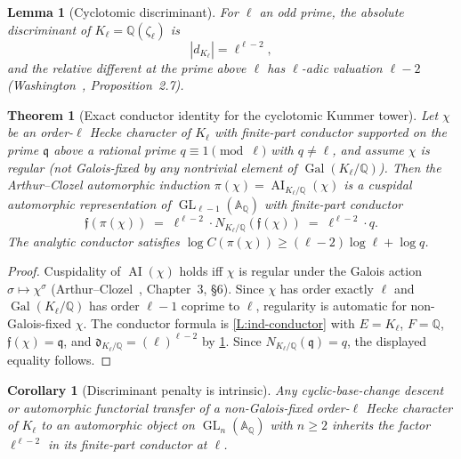\documentclass[11pt]{article}
\newtheorem{theorem}{Theorem}
\newtheorem{lemma}{Lemma}
\newtheorem{corollary}{Corollary}
\newcommand{\Q}{\mathbb Q}
\newcommand{\A}{\mathbb A}
\newcommand{\Gal}{\operatorname{Gal}}
\newcommand{\AI}{\operatorname{AI}}
\newcommand{\GL}{\operatorname{GL}}
\begin{document}
\begin{lemma}[Cyclotomic discriminant]\label{L:cyclo-disc}
For \(\ell\) an odd prime, the absolute discriminant of \(K_\ell=\Q(\zeta_\ell)\) is
\[
|d_{K_\ell}|=\ell^{\ell-2},
\]
and the relative different at the prime above \(\ell\) has \(\ell\)-adic valuation \(\ell-2\) (Washington~\cite{Washington}, Proposition~2.7).
\end{lemma}

\begin{theorem}[Exact conductor identity for the cyclotomic Kummer tower]\label{T:conductor-identity}
Let \(\chi\) be an order-\(\ell\) Hecke character of \(K_\ell\) with finite-part conductor supported on the prime \(\mathfrak q\) above a rational prime \(q\equiv 1\pmod\ell\) with \(q\ne\ell\), and assume \(\chi\) is regular (not Galois-fixed by any nontrivial element of \(\Gal(K_\ell/\Q)\)).  Then the Arthur--Clozel automorphic induction \(\pi(\chi)=\AI_{K_\ell/\Q}(\chi)\) is a cuspidal automorphic representation of \(\GL_{\ell-1}(\A_\Q)\) with finite-part conductor
\[
\mathfrak f(\pi(\chi))\;=\;\ell^{\ell-2}\cdot N_{K_\ell/\Q}(\mathfrak f(\chi))\;=\;\ell^{\ell-2}\cdot q.
\]
The analytic conductor satisfies \(\log C(\pi(\chi))\ge(\ell-2)\log\ell+\log q\).
\end{theorem}

\begin{proof}
Cuspidality of \(\AI(\chi)\) holds iff \(\chi\) is regular under the Galois action \(\sigma\mapsto\chi^\sigma\) (Arthur--Clozel~\cite{ArthurClozel}, Chapter~3, §6).  Since \(\chi\) has order exactly \(\ell\) and \(\Gal(K_\ell/\Q)\) has order \(\ell-1\) coprime to \(\ell\), regularity is automatic for non-Galois-fixed \(\chi\).  The conductor formula is \cref{L:ind-conductor} with \(E=K_\ell\), \(F=\Q\), \(\mathfrak f(\chi)=\mathfrak q\), and \(\mathfrak d_{K_\ell/\Q}=(\ell)^{\ell-2}\) by \cref{L:cyclo-disc}.  Since \(N_{K_\ell/\Q}(\mathfrak q)=q\), the displayed equality follows.
\end{proof}

\begin{corollary}[Discriminant penalty is intrinsic]\label{C:disc-intrinsic}
Any cyclic-base-change descent or automorphic functorial transfer of a non-Galois-fixed order-\(\ell\) Hecke character of \(K_\ell\) to an automorphic object on \(\GL_n(\A_\Q)\) with \(n\ge 2\) inherits the factor \(\ell^{\ell-2}\) in its finite-part conductor at \(\ell\).
\end{corollary}
\end{document}
